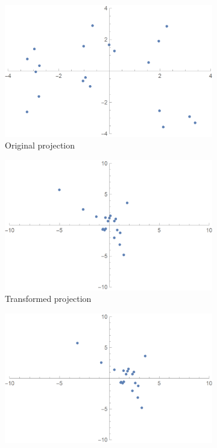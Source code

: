 \documentclass[11pt]{extarticle}
\begin{document}
    \begin{figure}[!ht]
        \centering
        \begin{subfigure}{.3\textwidth}
            \centering
            \includegraphics[scale=.1]{ma1.png}
            \caption{Original projection}
        \end{subfigure}
        \begin{subfigure}{.3\textwidth}
            \centering
            \includegraphics[scale=.1]{ma2.png}
            \caption{Transformed projection}
        \end{subfigure}
        \begin{subfigure}{.3\textwidth}
            \centering
            \includegraphics[scale=.1]{ma3.png}

\end{subfigure}
\end{figure}
\end{document}
